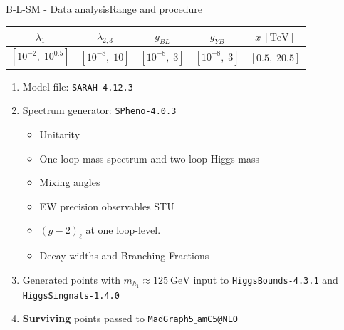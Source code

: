 \documentclass[10pt,xcolor=dvipsnames,mathserif]{beamer}
\begin{document}

\begin{frame}{B-L-SM - Data analysis}{Range and procedure}
		\begin{table}[htb!]
			\begin{center}
				\begin{tabular}{ccccc}
					\toprule                     
				 $\lambda_1$ & $\lambda_{2,3}$ & $g_{BL}$ & $g_{YB}$ & $x~\mathrm{[TeV]}$  
				 \\       
					\midrule
				$\left[10^{-2},\; 10^{0.5}
				\right]$	& $\left[10^{-8},\; 10
					\right]$ 			    							& $\left[10^{-8},\; 3
					\right]$		& $\left[10^{-8},\; 3
					\right]$	&	$\left[0.5,\; 20.5
					\right]$ 	\\
					\bottomrule
				\end{tabular}  
			\end{center}
		\end{table} 
		\begin{enumerate}
			\item Model file: \texttt{SARAH-4.12.3}
			\item Spectrum generator: \texttt{SPheno-4.0.3}
			\begin{itemize}
				\item Unitarity
				\item One-loop mass spectrum and two-loop Higgs mass
				\item Mixing angles
				\item EW precision observables STU
				\item $\left(g-2\right)_\ell$ at one loop-level. 
				\item Decay widths and Branching Fractions
			\end{itemize}
			\item Generated points with $m_{h_1} \approx 125 ~\mathrm{GeV}$ input to \texttt{HiggsBounds-4.3.1} and  \texttt{HiggsSingnals-1.4.0}
			\item \textbf{Surviving} points passed to \texttt{MadGraph5$\_$amC5@NLO}
		\end{enumerate}

\end{frame}
\end{document}
